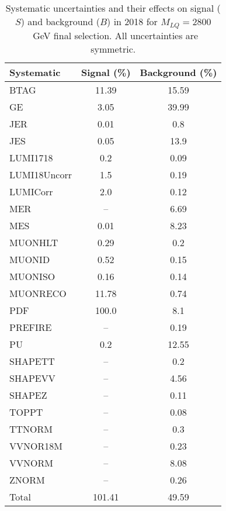 \begin{table}[htbp]
\begin{center}
\caption{Systematic uncertainties and their effects on signal ($S$) and background ($B$) in 2018 for $M_{LQ}=2800$~GeV final selection. All uncertainties are symmetric.}
\begin{tabular}{lcc}
\hline\hline
Systematic & Signal (\%) & Background (\%) \\ \hline 
BTAG & 11.39 & 15.59\\ 
GE & 3.05 & 39.99\\ 
JER & 0.01 & 0.8\\ 
JES & 0.05 & 13.9\\ 
LUMI1718 & 0.2 & 0.09\\ 
LUMI18Uncorr & 1.5 & 0.19\\ 
LUMICorr & 2.0 & 0.12\\ 
MER & -- & 6.69\\ 
MES & 0.01 & 8.23\\ 
MUONHLT & 0.29 & 0.2\\ 
MUONID & 0.52 & 0.15\\ 
MUONISO & 0.16 & 0.14\\ 
MUONRECO & 11.78 & 0.74\\ 
PDF & 100.0 & 8.1\\ 
PREFIRE & -- & 0.19\\ 
PU & 0.2 & 12.55\\ 
SHAPETT & -- & 0.2\\ 
SHAPEVV & -- & 4.56\\ 
SHAPEZ & -- & 0.11\\ 
TOPPT & -- & 0.08\\ 
TTNORM & -- & 0.3\\ 
VVNOR18M & -- & 0.23\\ 
VVNORM & -- & 8.08\\ 
ZNORM & -- & 0.26\\ 
Total & 101.41 & 49.59\\ \hline \hline
\end{tabular}
\label{tab:SysUncertainties_uujj_2800}
\end{center}
\end{table}

